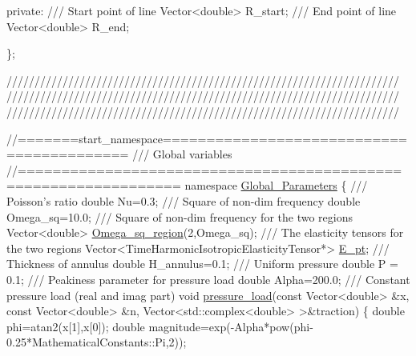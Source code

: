 \begin{DoxyCodeInclude}
\textcolor{keyword}{private}:
 \textcolor{comment}{}
\textcolor{comment}{ /// Start point of line}
\textcolor{comment}{} Vector<double> R\_start;
 \textcolor{comment}{}
\textcolor{comment}{ /// End point of line}
\textcolor{comment}{} Vector<double> R\_end;

\};


\textcolor{comment}{}
\textcolor{comment}{//////////////////////////////////////////////////////////////////////}
\textcolor{comment}{//////////////////////////////////////////////////////////////////////}
\textcolor{comment}{//////////////////////////////////////////////////////////////////////}
\textcolor{comment}{}

\textcolor{comment}{//=======start\_namespace==========================================}\textcolor{comment}{}
\textcolor{comment}{/// Global variables}
\textcolor{comment}{}\textcolor{comment}{//================================================================}
\textcolor{keyword}{namespace }\hyperlink{namespaceGlobal__Parameters}{Global\_Parameters}
\{
\textcolor{comment}{}
\textcolor{comment}{ /// Poisson's ratio}
\textcolor{comment}{} \textcolor{keywordtype}{double} Nu=0.3;
\textcolor{comment}{}
\textcolor{comment}{ /// Square of non-dim frequency }
\textcolor{comment}{} \textcolor{keywordtype}{double} Omega\_sq=10.0; 
\textcolor{comment}{}
\textcolor{comment}{ /// Square of non-dim frequency for the two regions}
\textcolor{comment}{} Vector<double> \hyperlink{namespaceGlobal__Parameters_a58a76124a7c047adf58388cc12e84f23}{Omega\_sq\_region}(2,Omega\_sq);
  \textcolor{comment}{}
\textcolor{comment}{ /// The elasticity tensors for the two regions}
\textcolor{comment}{} Vector<TimeHarmonicIsotropicElasticityTensor*> \hyperlink{namespaceGlobal__Parameters_a73c731fa617a9d92851e4195493262e7}{E\_pt};
 \textcolor{comment}{}
\textcolor{comment}{ /// Thickness of annulus}
\textcolor{comment}{} \textcolor{keywordtype}{double} H\_annulus=0.1;
\textcolor{comment}{}
\textcolor{comment}{ /// Uniform pressure}
\textcolor{comment}{} \textcolor{keywordtype}{double} P = 0.1;
\textcolor{comment}{}
\textcolor{comment}{ /// Peakiness parameter for pressure load}
\textcolor{comment}{} \textcolor{keywordtype}{double} Alpha=200.0;
\textcolor{comment}{}
\textcolor{comment}{ /// Constant pressure load (real and imag part)}
\textcolor{comment}{} \textcolor{keywordtype}{void} \hyperlink{namespaceGlobal__Parameters_a0ddb3a77481b907fbb34f2e8d0a6eb9f}{pressure\_load}(\textcolor{keyword}{const} Vector<double> &x,
                        \textcolor{keyword}{const} Vector<double> &n, 
                        Vector<std::complex<double> >&traction)
 \{
  \textcolor{keywordtype}{double} phi=atan2(x[1],x[0]);
  \textcolor{keywordtype}{double} magnitude=exp(-Alpha*pow(phi-0.25*MathematicalConstants::Pi,2));


\end{DoxyCodeInclude}
